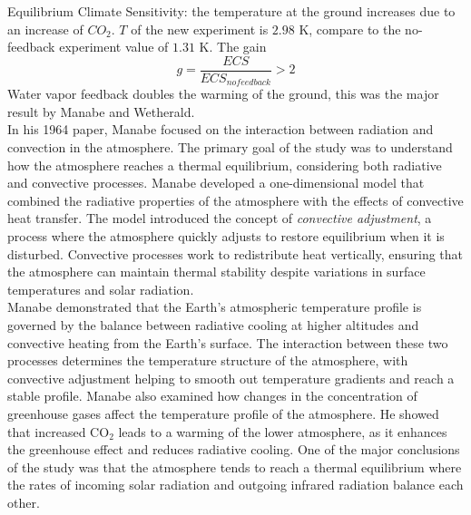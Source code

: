Equilibrium Climate Sensitivity: the temperature at the
ground increases due to an increase of $CO_2$. $T$ of the new experiment is $2.98$ K, compare to the no-feedback experiment value of $1.31$ K. The gain
$$g=\frac{ECS}{ECS_{nofeedback}}>2$$
 Water vapor feedback doubles the warming of the ground, this was the major result by Manabe and
Wetherald.\\
[0.4 cm]

In his 1964 paper, Manabe\cite{Manabe1964} focused on the interaction between radiation and convection in the atmosphere. The primary goal of the study was to understand how the atmosphere reaches a thermal equilibrium, considering both radiative and convective processes. Manabe developed a one-dimensional model that combined the radiative properties of the atmosphere with the effects of convective heat transfer. The model introduced the concept of \textit{convective adjustment}, a process where the atmosphere quickly adjusts to restore equilibrium when it is disturbed. Convective processes work to redistribute heat vertically, ensuring that the atmosphere can maintain thermal stability despite variations in surface temperatures and solar radiation. \\

Manabe demonstrated that the Earth's atmospheric temperature profile is governed by the balance between radiative cooling at higher altitudes and convective heating from the Earth's surface. The interaction between these two processes determines the temperature structure of the atmosphere, with convective adjustment helping to smooth out temperature gradients and reach a stable profile. Manabe also examined how changes in the concentration of greenhouse gases affect the temperature profile of the atmosphere. He showed that increased CO$_2$ leads to a warming of the lower atmosphere, as it enhances the greenhouse effect and reduces radiative cooling. One of the major conclusions of the study was that the atmosphere tends to reach a thermal equilibrium where the rates of incoming solar radiation and outgoing infrared radiation balance each other. 




